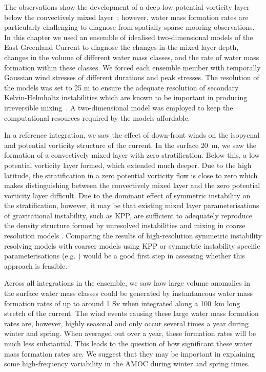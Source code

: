 The observations show the development of a deep low potential vorticity layer below the convectively mixed layer~\citep{LeBras2022}; however, water mass formation rates are particularly challenging to diagnose from spatially sparse mooring observations. In this chapter we used an ensemble of idealised two-dimensional models of the East Greenland Current to diagnose the changes in the mixed layer depth, changes in the volume of different water mass classes, and the rate of water mass formation within these classes. We forced each ensemble member with temporally Gaussian wind stresses of different durations and peak stresses. The resolution of the models was set to 25 m to ensure the adequate resolution of secondary Kelvin-Helmholtz instabilities which are known to be important in producing irreversible mixing~\citep{Griffiths2003a, Yankovsky2019}. A two-dimensional model was employed to keep the computational resources required by the models affordable\footnotemark.

In a reference integration, we saw the effect of down-front winds on the isopycnal and potential vorticity structure of the current. In the surface 20~m, we saw the formation of a convectively mixed layer with zero stratification. Below this, a low potential vorticity layer formed, which extended much deeper. Due to the high latitude, the stratification in a zero potential vorticity flow is close to zero which makes distinguishing between the convectively mixed layer and the zero potential vorticity layer difficult. Due to the dominant effect of symmetric instability on the stratification, however, it may be that existing mixed layer parameterisations of gravitational instability, such as KPP, are sufficient to adequately reproduce the density structure formed by unresolved instabilities and mixing in coarse resolution models \citep{Large1994}. Comparing the results of high-resolution symmetric instability resolving models with coarser models using KPP or symmetric instability specific parameterisations (e.g. \citet{Bachman2017, Yankovsky2021}) would be a good first step in assessing whether this approach is feasible.

Across all integrations in the ensemble, we saw how large volume anomalies in the surface water mass classes could be generated by instantaneous water mass formation rates of up to around 1 Sv when integrated along a 100~km long stretch of the current. The wind events causing these large water mass formation rates are, however, highly seasonal and only occur several times a year during winter and spring. When averaged out over a year, these formation rates will be much less substantial. This leads to the question of how significant these water mass formation rates are. We suggest that they may be important in explaining some high-frequency variability in the AMOC during winter and spring times.

